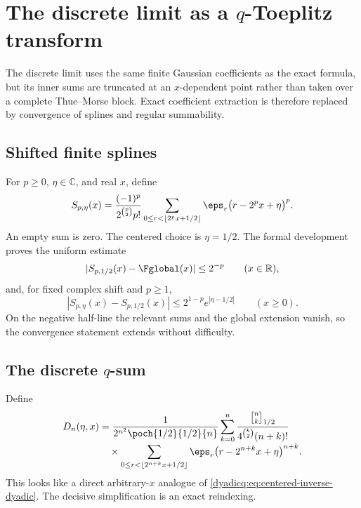 \documentclass[11pt,oneside]{article}
\theoremstyle{definition}
\theoremstyle{remark}
\newcommand{\R}{\mathbb R}
\newcommand{\C}{\mathbb C}
\newcommand{\qbinom}[3]{\genfrac{[}{]}{0pt}{}{#1}{#2}_{#3}}
\begin{document}
\section{The discrete limit as a \texorpdfstring{$q$}{q}-Toeplitz transform}

The discrete limit uses the same finite Gaussian coefficients as the exact
formula, but its inner sums are truncated at an $x$-dependent point rather
than taken over a complete Thue--Morse block.  Exact coefficient extraction is
therefore replaced by convergence of splines and regular summability.

\subsection{Shifted finite splines}

For $p\ge0$, $\eta\in\C$, and real $x$, define
\begin{equation}\label{dyadicq:eq:shifted-spline}
 S_{p,\eta}(x)=
 \frac{(-1)^p}{2^{\binom p2}p!}
 \sum_{0\le r<\lfloor2^px+1/2\rfloor}
 \eps_r\bigl(r-2^px+\eta\bigr)^p.
\end{equation}
An empty sum is zero.  The centered choice is $\eta=1/2$.
The formal development proves the uniform estimate
\begin{equation}\label{dyadicq:eq:centered-spline-error}
 |S_{p,1/2}(x)-\Fglobal(x)|\le2^{-p}
 \qquad(x\in\R),
\end{equation}
and, for fixed complex shift and $p\ge1$,
\begin{equation}\label{dyadicq:eq:shift-spline-error}
 |S_{p,\eta}(x)-S_{p,1/2}(x)|
 \le2^{1-p}e^{|\eta-1/2|}
 \qquad(x\ge0).
\end{equation}
On the negative half-line the relevant sums and the global extension vanish,
so the convergence statement extends without difficulty.

\subsection{The discrete \texorpdfstring{$q$}{q}-sum}

Define
\begin{align}\label{dyadicq:eq:Dn-definition}
 D_n(\eta,x)
 &=\frac1{2^{n^2}\poch{1/2}{1/2}{n}}
 \sum_{k=0}^{n}
 \frac{\qbinom{n}{k}{1/2}}
 {4^{\binom k2}(n+k)!}
 \notag\\[-0.25em]
 &\quad\times
 \sum_{0\le r<\lfloor2^{n+k}x+1/2\rfloor}
 \eps_r\bigl(r-2^{n+k}x+\eta\bigr)^{n+k}.
\end{align}
This looks like a direct arbitrary-$x$ analogue of
\eqref{dyadicq:eq:centered-inverse-dyadic}.  The decisive simplification is an exact
reindexing.
\end{document}
